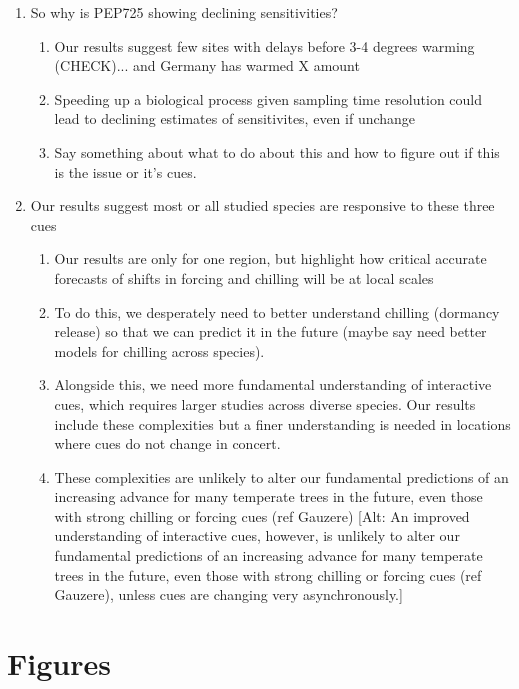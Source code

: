 \documentclass[11pt,letter]{article}
\begin{document}
\begin{enumerate}
\item So why is PEP725 showing declining sensitivities?

\begin{enumerate}
\item Our results suggest few sites with delays before 3-4 degrees warming (CHECK)... and Germany has warmed X amount
\item Speeding up a biological process given sampling time resolution could lead to declining estimates of sensitivites, even if unchange
\item Say something about what to do about this and how to figure out if this is the issue or it's cues. 
\end{enumerate}

\item Our results suggest most or all studied species are responsive to these three cues
\begin{enumerate}
\item Our results are only for one region, but highlight how critical accurate forecasts of shifts in forcing and chilling will be at local scales
\item To do this, we desperately need to better understand chilling (dormancy release) so that we can predict it in the future (maybe say need better models for chilling across species). 
\item Alongside this, we need more fundamental understanding of interactive cues, which requires larger studies across diverse species. Our results include these complexities but a finer understanding is needed in locations where cues do not change in concert.
\item These complexities are unlikely to alter our fundamental predictions of an increasing advance for many temperate trees in the future, even those with strong chilling or forcing cues (ref Gauzere) [Alt: An improved understanding of interactive cues, however, is unlikely to alter our fundamental predictions of an increasing advance for many temperate trees in the future, even those with strong chilling or forcing cues (ref Gauzere), unless cues are changing very asynchronously.]
\end{enumerate}

\end{enumerate}

\section* {Figures}
\end{document}
